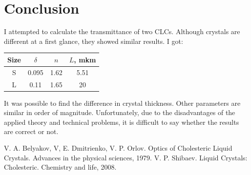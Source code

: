 \documentclass[a4paper, 12pt]{article}
\begin{document}
\section*{Conclusion}
I attempted to calculate the transmittance of two CLCs. Although crystals are different at a first glance, they showed similar results. I got: 
\begin{center} 

\begin{tabular}{|c|c|c|c|} 
\hline 
Size & $\delta$ & $n$ & $L$, mkm \\ 
\hline 
S & 0.095 & 1.62 & 5.51 \\ 
\hline 
L & 0.11 & 1.65 & 20\\
\hline 
\end{tabular} 

\end{center}
It was possible to find the difference in crystal thickness. Other parameters are similar in order of magnitude. Unfortunately, due to the disadvantages of the applied theory and technical problems, it is difficult to say whether the results are correct or not.
\begin{thebibliography}{9}
V. A. Belyakov, V, E. Dmitrienko, V. P. Orlov. 
Optics of Cholesteric Liquid Crystals.
Advances in the physical sciences, 1979.
V. P. Shibaev. 
Liquid Crystals: Cholesteric. 
Chemistry and life, 2008.
\end{thebibliography}
\end{document}
